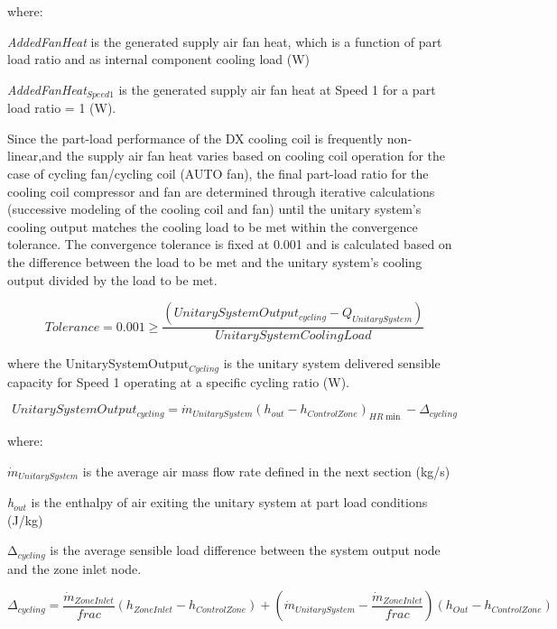 where:

\emph{AddedFanHeat} is the generated supply air fan heat, which is a function of part load ratio and as internal component cooling load (W)

\emph{AddedFanHeat\(_{Speed1}\)} is the generated supply air fan heat at Speed 1 for a part load ratio = 1 (W).

Since the part-load performance of the DX cooling coil is frequently non-linear,and the supply air fan heat varies based on cooling coil operation for the case of cycling fan/cycling coil (AUTO fan), the final part-load ratio for the cooling coil compressor and fan are determined through iterative calculations (successive modeling of the cooling coil and fan) until the unitary system's cooling output matches the cooling load to be met within the convergence tolerance. The convergence tolerance is fixed at 0.001 and is calculated based on the difference between the load to be met and the unitary system's cooling output divided by the load to be met.

\begin{equation}
Tolerance = 0.001 \ge \frac{{\left( {UnitarySystemOutpu{t_{cycling}} - {Q_{UnitarySystem}}} \right)}}{{UnitarySystemCoolingLoad}}
\end{equation}

where the UnitarySystemOutput\(_{Cycling}\) is the unitary system delivered sensible capacity for Speed 1 operating at a specific cycling ratio (W).

\begin{equation}
UnitarySystemOutpu{t_{cycling}} = {\dot{m}_{UnitarySystem}}{\left( {{h_{out}} - {h_{ControlZone}}} \right)_{HR\min }} - {\Delta_{cycling}}
\end{equation}

where:

\({\dot m{_{UnitarySystem}}}\) is the average air mass flow rate defined in the next section (kg/s)

\emph{h\(_{out}\)} is the enthalpy of air exiting the unitary system at part load conditions (J/kg)

Δ\(_{cycling}\) is the average sensible load difference between the system output node and the zone inlet node.

\begin{equation}
{\Delta_{cycling}} = \frac{\dot{m}_{ZoneInlet}}{frac} \left( {{h_{ZoneInlet}} - {h_{ControlZone}}} \right) + \left( {\dot{m}_{UnitarySystem}} - \frac{\dot{m}_{ZoneInlet}}{frac} \right) \left( {{h_{Out}} - {h_{ControlZone}}} \right)
\end{equation}

